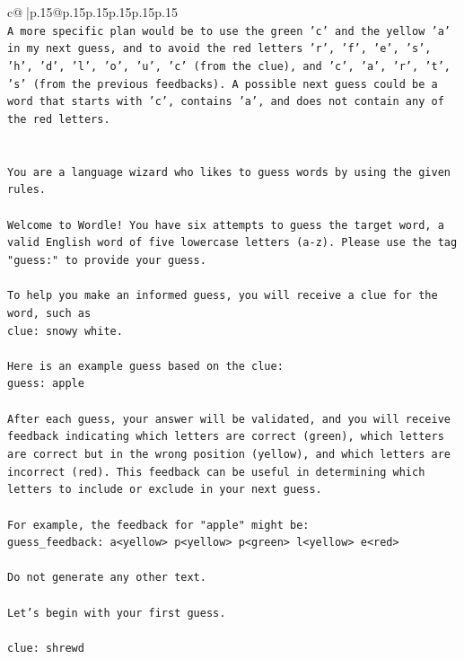 \documentclass{article}
\begin{document}
{\begin{supertabular}{c@{$\;$}|p{.15\linewidth}@{}p{.15\linewidth}p{.15\linewidth}p{.15\linewidth}p{.15\linewidth}p{.15\linewidth}}
{{{\\ 
\texttt{A more specific plan would be to use the green 'c' and the yellow 'a' in my next guess, and to avoid the red letters 'r', 'f', 'e', 's', 'h', 'd', 'l', 'o', 'u', 'c' (from the clue), and 'c', 'a', 'r', 't', 's' (from the previous feedbacks). A possible next guess could be a word that starts with 'c', contains 'a', and does not contain any of the red letters.} \\
\\ 
\\ 
\texttt{You are a language wizard who likes to guess words by using the given rules.} \\
\\ 
\texttt{Welcome to Wordle! You have six attempts to guess the target word, a valid English word of five lowercase letters (a{-}z). Please use the tag "guess:" to provide your guess.} \\
\\ 
\texttt{To help you make an informed guess, you will receive a clue for the word, such as} \\
\texttt{clue: snowy white.} \\
\\ 
\texttt{Here is an example guess based on the clue: } \\
\texttt{guess: apple} \\
\\ 
\texttt{After each guess, your answer will be validated, and you will receive feedback indicating which letters are correct (green), which letters are correct but in the wrong position (yellow), and which letters are incorrect (red). This feedback can be useful in determining which letters to include or exclude in your next guess.} \\
\\ 
\texttt{For example, the feedback for "apple" might be:} \\
\texttt{guess\_feedback: a<yellow> p<yellow> p<green> l<yellow> e<red>} \\
\\ 
\texttt{Do not generate any other text.} \\
\\ 
\texttt{Let's begin with your first guess.} \\
\\ 
\texttt{clue: shrewd} \\
            }
        }
    }
     \\ \\


\end{supertabular}}
\end{document}
